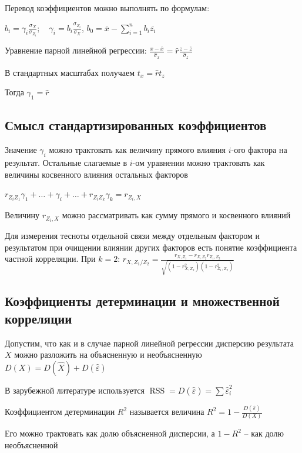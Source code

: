 Перевод коэффициентов можно выполнять по формулам:

$b_i = \gamma_i \frac{\sigma_X}{\sigma_{Z_i}}; \quad \gamma_i = b_i \frac{\sigma_{Z_i}}{\sigma_X}$, $b_0 = \overline{x} - \sum_{i = 1}^n b_i \overline{z_i}$

\Ex Уравнение парной линейной регрессии:
$\frac{x - \overline{x}}{\hat \sigma_x} = \hat r \frac{z - \overline{z}}{\hat \sigma_z}$

В стандартных масштабах получаем $t_x = \hat r t_z$

Тогда $\gamma_1 = \hat r$

\subsection{Смысл стандартизированных коэффициентов}

Значение $\gamma_i$ можно трактовать как величину прямого влияния $i$-ого фактора на результат. Остальные слагаемые в $i$-ом уравнении можно трактовать
как величины косвенного влияния остальных факторов 

$r_{Z_i Z_1} \gamma_1 + \dots + \gamma_i + \dots + r_{Z_i Z_k} \gamma_k = r_{Z_i, X}$

Величину $r_{Z_i, X}$ можно рассматривать как сумму прямого и косвенного влияний

\Nota Для измерения тесноты отдельной связи между отдельным фактором и результатом при очищении влиянии других факторов
есть понятие коэффициента частной корреляции. При $k = 2$: $r_{X, Z_1 / Z_2} = \frac{r_{X, Z_1} - r_{X, Z_2} r_{Z_1, Z_2}}{\sqrt{(1 - r_{X, Z_2}^2)(1 - r_{Z_1, Z_2}^2)}}$


\subsection{Коэффициенты детерминации и множественной корреляции}

Допустим, что как и в случае парной линейной регрессии дисперсию результата $X$ можно разложить на объясненную и необъясненную $D(X) = D(\hat X) + D(\hat \varepsilon)$

\Nota В зарубежной литературе используется $\operatorname{RSS} = D(\hat \varepsilon) = \sum \hat \varepsilon_i^2$

\Def Коэффициентом детерминации $R^2$ называется величина $R^2 = 1 - \frac{D(\hat \varepsilon)}{D(X)}$

Его можно трактовать как долю объясненной дисперсии, а $1 - R^2$ -- как долю необъясненной

